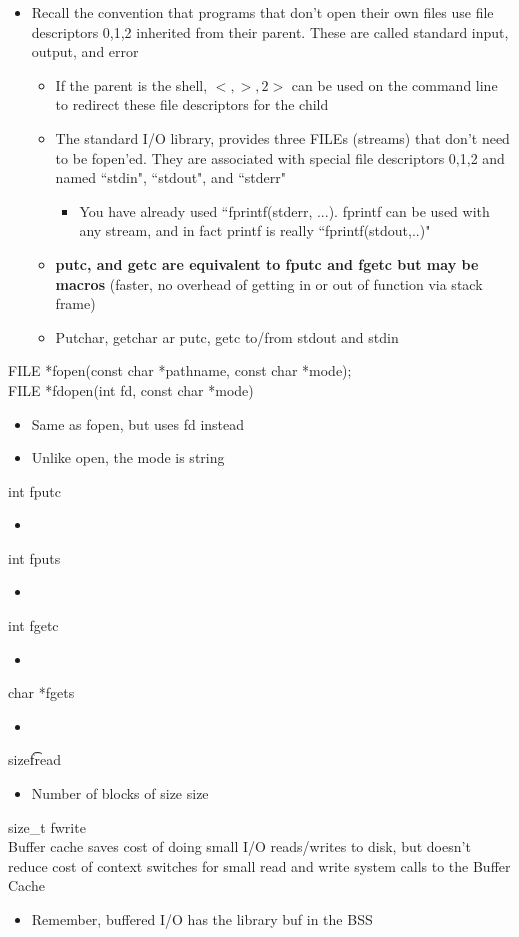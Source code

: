 \begin{itemize}
    \item Recall the convention that programs that don't open their own files use file descriptors 0,1,2 inherited from their parent. These are called standard input, output, and error
    \begin{itemize}
        \item If the parent is the shell, $<, >, 2>$ can be used on the command line to redirect these file descriptors for the child
        \item The standard I/O library, provides three FILEs (streams) that don't need to be fopen'ed. They are associated with special file descriptors 0,1,2 and named ``stdin", ``stdout", and ``stderr"
        \begin{itemize}
            \item You have already used ``fprintf(stderr, ...). fprintf can be used with any stream, and in fact printf is really ``fprintf(stdout,..)"
        \end{itemize}
        \item \textbf{putc, and getc are equivalent to fputc and fgetc but may be macros} (faster, no overhead of getting in or out of function via stack frame)
        \item Putchar, getchar ar putc, getc to/from stdout and stdin
    \end{itemize}
\end{itemize}
FILE *fopen(const char *pathname, const char *mode);\\
FILE *fdopen(int fd, const char *mode)
\begin{itemize}
    \item Same as fopen, but uses fd instead
    \item Unlike open, the mode is string
\end{itemize}
int fputc
\begin{itemize}
    \item 
\end{itemize}
int fputs
\begin{itemize}
    \item 
\end{itemize}
int fgetc
\begin{itemize}
    \item 
\end{itemize}
char *fgets
\begin{itemize}
    \item 
\end{itemize}
size\t fread
\begin{itemize}
    \item Number of blocks of size size
\end{itemize}
size\_t fwrite
\\
Buffer cache saves cost of doing small I/O reads/writes to disk, but doesn't reduce cost of context switches for small read and write system calls to the Buffer Cache
\begin{itemize}
    \item Remember, buffered I/O has the library buf in the BSS
\end{itemize}